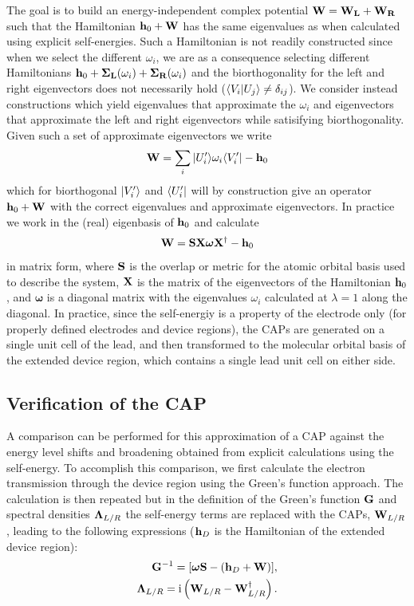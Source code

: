 The goal is to build an energy-independent complex potential
$\mathbf{W} = \mathbf{W_L} + \mathbf{W_R}$
such that the Hamiltonian $\mathbf{h}_0 + \mathbf{W}$ has the same eigenvalues
as when calculated using explicit self-energies.
Such a Hamiltonian is not readily constructed since when we select the
different $\omega_i$, we are as a consequence selecting different Hamiltonians
$\mathbf{h}_0 + \mathbf{\Sigma_L}(\omega_i) + \mathbf{\Sigma_R}(\omega_i)$
and the biorthogonality for the left and right eigenvectors does not
necessarily hold ($\langle V_i|U_j \rangle \ne \delta_{ij}$). We consider instead
constructions which yield eigenvalues that approximate the $\omega_i$  and
eigenvectors that approximate the left and right eigenvectors while
satisifying biorthogonality. Given such a set of approximate eigenvectors
we write
\begin{equation}
    \mathbf{W} = \sum_i  |U^\prime_i \rangle \omega_i \langle V^\prime_i| - \mathbf{h}_0
    \label{eq:capsdefUV}
\end{equation}
which for biorthogonal $|V^\prime_i \rangle$ and $\langle U^\prime_i|$ will by
construction give an operator $\mathbf{h}_0 + \mathbf{W}$ with the correct eigenvalues
and approximate eigenvectors. In practice we work in the (real) eigenbasis
of $\mathbf{h}_0$ and calculate
\begin{equation}
    \mathbf{W} = \mathbf{S} \mathbf{X} \boldsymbol{\omega}\mathbf{X}^\dagger - \mathbf{h}_0
    \label{eq:capsdefX}
\end{equation}
in matrix form, where $\mathbf{S}$ is the overlap or metric for the atomic
orbital basis used to describe the system, $\mathbf{X}$ is the matrix of the
eigenvectors of the Hamiltonian $\mathbf{h}_0$, and $\boldsymbol{\omega}$ is a
diagonal matrix with the eigenvalues $\omega_i$ calculated at
$\lambda = 1$ along the diagonal.
In practice, since the self-energiy is a property of the electrode only
(for properly defined electrodes and device regions), the \acp{CAP} are
generated on a single unit cell of the lead, and then transformed to the
molecular orbital basis of the extended device region, which contains a
single lead unit cell on either side.

\subsection{Verification of the \ac{CAP}}
A comparison can be performed for this approximation of a \ac{CAP} 
against the energy level shifts and broadening
obtained from explicit calculations using the self-energy. To accomplish
this comparison, we first calculate the electron transmission through
the device region using the Green's function
approach. The calculation is then repeated but in the definition of the
Green's function ${\bf G}$ and spectral densities ${\bf \Lambda}_{L/R}$ the
self-energy terms are replaced with the \acp{CAP}, $\mathbf{W}_{L/R}$, leading
to the following expressions ($\mathbf{h}_D$ is the Hamiltonian of the extended
device region):
\numparts
\begin{eqnarray}
	  \mathbf{G}^{-1} = [\boldsymbol{\omega}\mathbf{S} - (\mathbf{h}_D + \mathbf{W})], \\
	  \mathbf{\Lambda}_{L/R} = \mathrm{i} \left( \mathbf{W}_{L/R} - \mathbf{W}^\dagger_{L/R}
    \right).
  \label{eq:glambdadef}
\end{eqnarray}
\endnumparts

